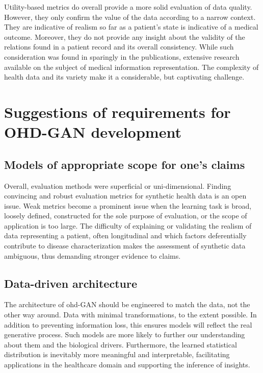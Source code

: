 Utility-based metrics do overall provide a more solid evaluation of data quality. However, they only confirm the value of the data according to a narrow context. They are indicative of realism so far as a patient's state is indicative of a medical outcome. Moreover, they do not provide any insight about the validity of the relations found in a patient record and its overall consistency. While such consideration was found in sparingly in the publications, extensive research available on the subject of medical information representation. The complexity of health data and its variety make it a considerable, but captivating challenge.\par

\section{Suggestions of requirements for OHD-GAN development}

\subsection{Models of appropriate scope for one's claims}\label{sec:basic}
Overall, evaluation methods were superficial or uni-dimensional. Finding convincing and robust evaluation metrics for synthetic health data is an open issue. Weak metrics become a prominent issue when the learning task is broad, loosely defined, constructed for the sole purpose of evaluation, or the scope of application is too large. The difficulty of explaining or validating the realism of data representing a patient, often longitudinal and which factors deferentially contribute to disease characterization makes the assessment of synthetic data ambiguous, thus demanding stronger evidence to claims.\par

%
%
\subsection{Data-driven architecture}\label{sec:archi}
The architecture of \gls{ohd}-GAN should be engineered to match the data, not the other way around. Data with minimal transformations, to the extent possible. In addition to preventing information loss, this ensures models will reflect the real generative process. Such models are more likely to further our understanding about them and the biological drivers. Furthermore, the learned statistical distribution is inevitably more meaningful and interpretable, facilitating applications in the healthcare domain and supporting the inference of insights.\par

